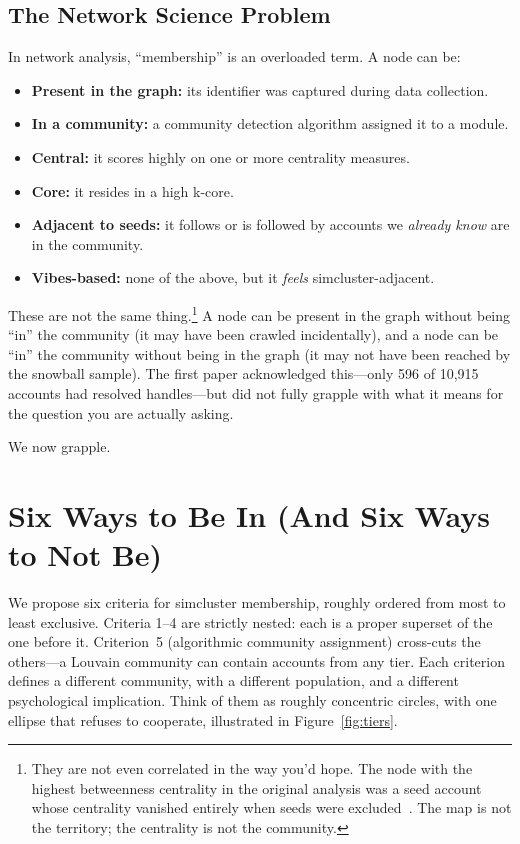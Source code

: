 \documentclass[11pt,a4paper]{article}
\begin{document}
\subsection{The Network Science Problem}

In network analysis, ``membership'' is an overloaded term. A node can be:

\begin{itemize}[leftmargin=*]
    \item \textbf{Present in the graph:} its identifier was captured during data collection.
    \item \textbf{In a community:} a community detection algorithm assigned it to a module.
    \item \textbf{Central:} it scores highly on one or more centrality measures.
    \item \textbf{Core:} it resides in a high k-core.
    \item \textbf{Adjacent to seeds:} it follows or is followed by accounts we \textit{already know} are in the community.
    \item \textbf{Vibes-based:} none of the above, but it \textit{feels} simcluster-adjacent.
\end{itemize}

\noindent These are not the same thing.\footnote{They are not even correlated in the way you'd hope. The node with the highest betweenness centrality in the original analysis was a seed account whose centrality vanished entirely when seeds were excluded~\cite{simcluster-paper}. The map is not the territory; the centrality is not the community.} A node can be present in the graph without being ``in'' the community (it may have been crawled incidentally), and a node can be ``in'' the community without being in the graph (it may not have been reached by the snowball sample). The first paper acknowledged this---only 596 of 10,915 accounts had resolved handles---but did not fully grapple with what it means for the question you are actually asking.

We now grapple.

\section{Six Ways to Be In (And Six Ways to Not Be)}

We propose six criteria for simcluster membership, roughly ordered from most to least exclusive. Criteria 1--4 are strictly nested: each is a proper superset of the one before it. Criterion~5 (algorithmic community assignment) cross-cuts the others---a Louvain community can contain accounts from any tier. Each criterion defines a different community, with a different population, and a different psychological implication. Think of them as roughly concentric circles, with one ellipse that refuses to cooperate, illustrated in Figure~\ref{fig:tiers}.
\end{document}
